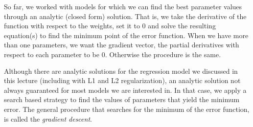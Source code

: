 So far, we worked with models for which we can find
the best parameter values through an analytic (closed form) solution.
That is,
we take the derivative of the function with respect to 
the weights,
set it to \num{0} and solve the resulting equation(s)
to find the minimum point of the error function.
When we have more than one parameters,
we want the gradient vector,
the partial derivatives with respect to each parameter to be \num{0}.
Otherwise the procedure is the same.

Although there are analytic solutions for the regression model
we discussed in this lecture (including with L1 and L2 regularization),
an analytic solution not always guaranteed
for most models we are interested in. 
In that case, we apply a search based strategy
to find the values of parameters that yield the minimum error.
The general procedure that searches
for the minimum of the error function,
is called the \emph{gradient descent}.



